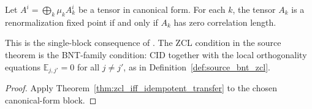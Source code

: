 \begin{theorem}%
    \label{thm:rfp_iff_zcl}
    \leanok
    Let $A^i=\bigoplus_k \mu_k A_k^i$ be a tensor in canonical form. For each
    $k$, the tensor $A_k$ is a renormalization fixed point if and only if
    $A_k$ has zero correlation length.

    This is the single-block consequence of
    \cite[Theorem~3.10]{Cirac2016MPDO_arXiv}. The ZCL condition in the source
    theorem is the BNT-family condition: CID together with the local
    orthogonality equations $\mathbb E_{j,j'}=0$ for all $j\ne j'$,
    as in Definition~\ref{def:source_bnt_zcl}.
\end{theorem}
\begin{proof}\leanok
    Apply Theorem~\ref{thm:zcl_iff_idempotent_transfer} to the chosen
    canonical-form block.
\end{proof}
